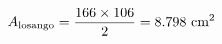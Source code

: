 \documentclass[preview]{standalone}
\begin{document}
\begin{align*}
\special{dvisvgm:raw <g id='unique000'>}A_{\text{losango}} = \frac{166 \times 106}{2} = 8.798\text{ cm}^2\special{dvisvgm:raw </g>}
\end{align*}
\end{document}
